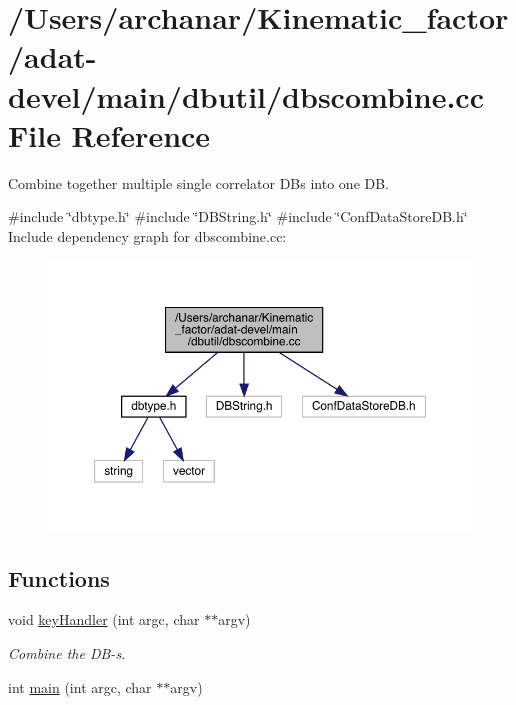 \hypertarget{adat-devel_2main_2dbutil_2dbscombine_8cc}{}\section{/\+Users/archanar/\+Kinematic\+\_\+factor/adat-\/devel/main/dbutil/dbscombine.cc File Reference}
\label{adat-devel_2main_2dbutil_2dbscombine_8cc}


Combine together multiple single correlator DB\textquotesingle{}s into one DB.  


{\ttfamily \#include \char`\"{}dbtype.\+h\char`\"{}}\newline
{\ttfamily \#include \char`\"{}D\+B\+String.\+h\char`\"{}}\newline
{\ttfamily \#include \char`\"{}Conf\+Data\+Store\+D\+B.\+h\char`\"{}}\newline
Include dependency graph for dbscombine.\+cc\+:
\nopagebreak
\begin{figure}[H]
\begin{center}
\leavevmode
\includegraphics[width=350pt]{d7/d38/adat-devel_2main_2dbutil_2dbscombine_8cc__incl}
\end{center}
\end{figure}
\subsection*{Functions}
\begin{DoxyCompactItemize}
\item 
void \mbox{\hyperlink{adat-devel_2main_2dbutil_2dbscombine_8cc_a4bb6e15c68dd2189289ab3095ab1ff5d}{key\+Handler}} (int argc, char $\ast$$\ast$argv)
\begin{DoxyCompactList}\small\item\em Combine the D\+B-\/s. \end{DoxyCompactList}\item 
int \mbox{\hyperlink{adat-devel_2main_2dbutil_2dbscombine_8cc_a3c04138a5bfe5d72780bb7e82a18e627}{main}} (int argc, char $\ast$$\ast$argv)
\end{DoxyCompactItemize}


